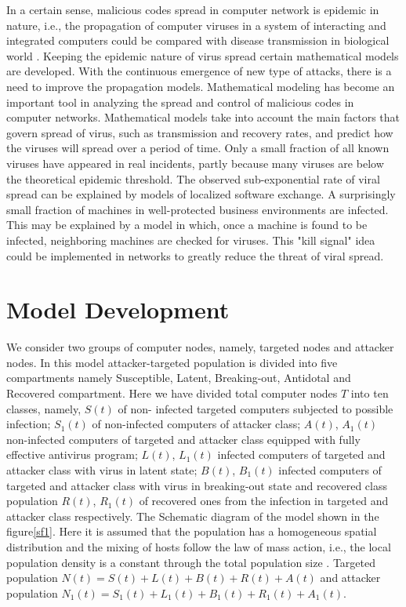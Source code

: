 \documentclass[conference]{IEEEtran}
\begin{document}
In a certain sense, malicious codes spread in computer network is epidemic in nature, i.e., the propagation of computer viruses in a system of interacting and integrated computers could be compared with disease transmission in biological world \cite{brady2015editor}. Keeping the epidemic nature of virus spread certain mathematical models are developed. With the continuous emergence of new type of attacks, there is a need to improve the propagation models. Mathematical modeling has become an important tool in analyzing the spread and control of malicious codes in computer networks. Mathematical models take into account the main factors that govern spread of virus, such as transmission and recovery rates, and predict how the viruses will spread over a period of time.
Only a small fraction of all known viruses have appeared in real incidents, partly because many viruses are below the theoretical epidemic threshold. The observed sub-exponential rate of viral spread can be explained by models of localized software exchange. A surprisingly small fraction of machines in well-protected business environments are infected. This may be explained by a model in which, once a machine is found to be infected, neighboring machines are checked for viruses. This "kill signal" idea could be implemented in networks to greatly reduce the threat of viral spread.
\thispagestyle{plain}
\newpage
\section{Model Development}
We consider two groups of computer nodes, namely, targeted nodes and attacker nodes. In this model attacker-targeted population is divided into five compartments namely Susceptible, Latent, Breaking-out, Antidotal and Recovered compartment. Here we have divided total computer nodes $T$ into ten classes, namely, $S(t)$ of non- infected targeted computers subjected to possible infection; $S_1(t)$ of non-infected computers of attacker class; $A(t)$, $A_1(t)$ non-infected computers of targeted and attacker class equipped with fully effective antivirus program; $L(t)$, $L_1(t)$ infected computers of targeted and attacker class with virus in latent state; $B(t)$, $B_1(t)$ infected computers of targeted and attacker class with virus in breaking-out state and recovered class population $R(t)$, $R_1(t)$ of recovered ones from the infection in targeted and attacker class respectively. The Schematic diagram of the model shown in the figure\ref{sf1}. Here it is assumed that the population has a homogeneous spatial distribution and the mixing of hosts follow the law of mass action, i.e., the local population density is a constant through the total population size \cite {piqueira2005epidemiological,piqueira2008dynamic,mishra2007seirs,mishra2010seiqrs}. Targeted population $N(t)=S(t)+L(t)+B(t)+R(t)+A(t)$   and attacker population $N_1(t)=S_1(t)+L_1(t)+B_1(t)+R_1(t)+A_1(t)$.
\end{document}
